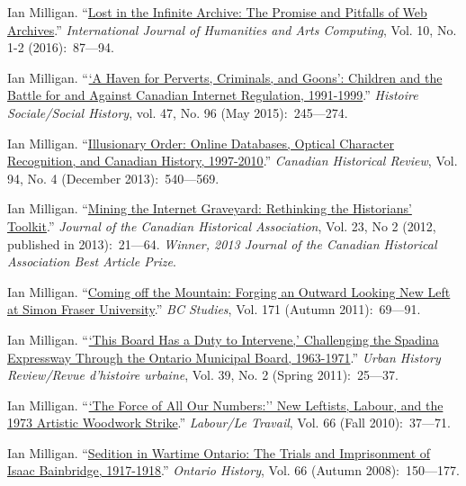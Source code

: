 \documentclass[11pt,article,oneside]{memoir}
\begin{document}
\ind Ian Milligan. ``\href{http://www.euppublishing.com/doi/abs/10.3366/ijhac.2016.0161}{Lost in the Infinite Archive: The Promise and Pitfalls of Web Archives}.'' \emph{International Journal of Humanities and Arts Computing}, Vol. 10, No. 1-2 (2016):~87---94.

\ind Ian Milligan. ``\href{http://muse.jhu.edu/login?auth=0&type=summary&url=/journals/histoire_sociale_social_history/v048/48.96.milligan.pdf}{`A Haven for Perverts, Criminals, and Goons': Children and the Battle for and Against Canadian Internet Regulation, 1991-1999}.'' \emph{Histoire Sociale/Social History}, vol. 47, No. 96 (May 2015):~245---274.

\ind Ian Milligan. ``\href{http://muse.jhu.edu/journals/canadian_historical_review/toc/can.94.4.html}{Illusionary Order: Online Databases, Optical Character Recognition, and Canadian History, 1997-2010}.'' \emph{Canadian Historical Review}, Vol. 94, No. 4 (December 2013):~540---569.

\ind Ian Milligan. ``\href{http://www.erudit.org/revue/jcha/2012/v23/n2/1015788ar.html}{Mining the Internet Graveyard: Rethinking the Historians' Toolkit}.'' \emph{Journal of the Canadian Historical Association}, Vol. 23, No 2 (2012, published in 2013):~21---64. \textit{Winner, 2013 Journal of the Canadian Historical Association Best Article Prize}.

\ind Ian Milligan. ``\href{http://ojs.library.ubc.ca/index.php/bcstudies/article/view/2046}{Coming off the Mountain: Forging an Outward Looking New Left at Simon Fraser University}.'' \emph{BC Studies}, Vol. 171 (Autumn 2011):~69---91.

\ind Ian Milligan. ``\href{https://ianmilligan.ca/2013/06/17/post-firewall-this-board-has-a-duty-to-intervene/}{`This Board Has a Duty to Intervene,' Challenging the Spadina Expressway Through the Ontario Municipal Board, 1963-1971}.'' \emph{Urban History Review/Revue d'histoire urbaine}, Vol. 39, No. 2 (Spring 2011):~25---37.

\ind Ian Milligan. ``\href{http://www.lltjournal.ca/index.php/llt/article/download/5613/6476}{`The Force of All Our Numbers:'' New Leftists, Labour, and the 1973 Artistic Woodwork Strike}.'' \emph{Labour/Le Travail}, Vol. 66 (Fall 2010):~37---71.

\ind Ian Milligan. ``\href{http://search.proquest.com.proxy.lib.uwaterloo.ca/docview/208529434?accountid=14906}{Sedition in Wartime Ontario: The Trials and Imprisonment of Isaac Bainbridge, 1917-1918}.'' \emph{Ontario History}, Vol. 66 (Autumn 2008):~150---177.
\end{document}
